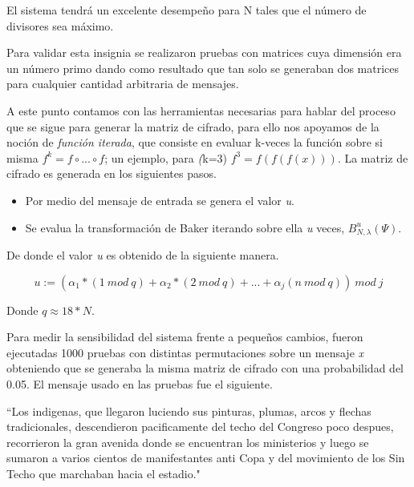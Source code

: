 \begin{insig}
 El sistema tendr\'a un excelente desempeño para N tales que el n\'umero de divisores sea m\'aximo.
\end{insig}

Para validar esta insignia se realizaron pruebas con matrices cuya dimensi\'on era un n\'umero primo dando como resultado que tan solo se generaban dos matrices para cualquier cantidad arbitraria de mensajes.

A este punto contamos con las herramientas necesarias para hablar del proceso que se sigue para generar la matriz de cifrado, para ello nos apoyamos de la noci\'on de \emph{funci\'on iterada}, que consiste en evaluar k-veces la funci\'on sobre si misma $f^{k}=f\circ ... \circ f $; un ejemplo, para \emph(k=3) $f^{3}=f(f(f(x)))$. La matriz de cifrado es generada en los siguientes pasos.

\begin{itemize}
 \item Por medio del mensaje de entrada se genera el valor \emph{u}.
 \item Se evalua la transformaci\'on de Baker iterando sobre ella \emph{u} veces, $B^{u}_{N,\lambda}(\Psi)$.
\end{itemize}

De donde el valor \emph{u} es obtenido de la siguiente manera.

$$u :=  (\alpha_{1}*(1 \ mod \ q)+\alpha_{2}*(2 \ mod \ q)+...+\alpha_{j}(n \ mod \ q)) \ mod \ j $$

Donde $q\approx 18*N$.

Para medir la sensibilidad del sistema frente a pequeños cambios, fueron ejecutadas 1000 pruebas con distintas permutaciones sobre un mensaje \emph{x} obteniendo que se generaba la misma matriz de cifrado con una probabilidad del 0.05. El mensaje usado en las pruebas fue el siguiente.

\begin{center}
``Los indigenas, que llegaron luciendo sus pinturas, plumas, arcos y flechas tradicionales, descendieron pacificamente del techo del Congreso poco despues, recorrieron la gran avenida donde se encuentran los ministerios y luego se sumaron a varios cientos de manifestantes anti Copa y del movimiento de los Sin Techo que marchaban hacia el estadio."
\end{center}


